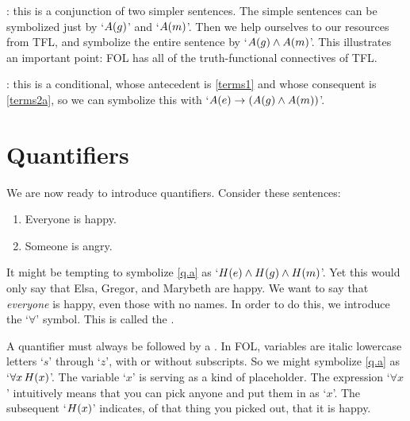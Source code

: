 : this is a conjunction of two simpler sentences. The simple sentences can be symbolized just by `$A(g)$' and `$A(m)$'. Then we help ourselves to our resources from TFL, and symbolize the entire sentence by `$A(g) \wedge A(m)$'. This illustrates an important point: FOL has all of the truth-functional connectives of TFL.

: this is a conditional, whose antecedent is \cref*{terms1} and whose consequent is \cref*{terms2a}, so we can symbolize this with `$A(e) \rightarrow (A(g) \wedge A(m))$'.

\section{Quantifiers}
We are now ready to introduce quantifiers. Consider these sentences:
	\begin{enumerate}
		\item\label{q.a} Everyone is happy.
		\item\label{q.e} Someone is angry.
	\end{enumerate}
It might be tempting to symbolize \cref*{q.a} as `$H(e) \wedge H(g) \wedge H(m)$'. Yet this would only say that Elsa, Gregor, and Marybeth are happy. We want to say that \emph{everyone} is happy, even those with no names. In order to do this, we introduce the `$\forall$' symbol. This is called the .


A quantifier must always be followed by a . In FOL, variables are italic lowercase letters `$s$' through `$z$', with or without subscripts. So we might symbolize \cref*{q.a} as `$\forall x\, H(x)$'.  The variable `$x$' is serving as a kind of placeholder. The expression `$\forall x$' intuitively means that you can pick anyone and put them in as `$x$'. The subsequent `$H(x)$' indicates, of that thing you picked out, that it is happy.




